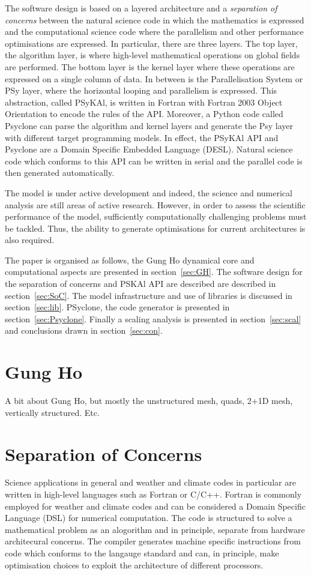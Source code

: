 \documentclass[times]{elsarticle}
\begin{document}
The software design is based on a layered architecture and a 
{\em separation of concerns} between the natural science code in which
the mathematics is expressed and the computational science code where the
parallelism and other performance optimisations are expressed. In particular,
there are three layers. The top layer, the algorithm layer, is where high-level mathematical 
operations on global fields are performed. The bottom layer is the kernel layer
where these operations are expressed on a single column of data. In between is the
Parallelisation System or PSy layer, where the horizontal looping and parallelism is
expressed. This abstraction, called PSyKAl, is written in Fortran with Fortran 2003
Object Orientation to encode the rules of the API.
Moreover, a Python code called Psyclone can parse the algorithm and kernel layers and
generate the Psy layer with different target programming models. In effect, the PSyKAl API
and Psyclone are a Domain Specific Embedded Language (DESL). Natural science code which
conforms to this API can be written in serial and the parallel code is then generated automatically.

The model is under active development and indeed, the science and
numerical analysis are still areas of active research. However, in
order to assess the scientific performance of the model, sufficiently
computationally challenging problems must be tackled. Thus, the
ability to generate optimisations for current architectures is also
required. 

The paper is organised as follows, the Gung Ho dynamical core and
computational aspects are presented in section~\ref{sec:GH}. The
software design for the separation of concerns and PSKAl API are described 
are described in section~\ref{sec:SoC}. The model infrastructure and
use of libraries is discussed in section~\ref{sec:lib}. PSyclone, the
code generator is presented in section~\ref{sec:Psyclone}. Finally a
scaling analysis is presented in section~\ref{sec:scal} and
conclusions drawn in section~\ref{sec:con}.

\section{\label{sec:GH}Gung Ho}
A bit about Gung Ho, but mostly the unstructured mesh, quads, 2+1D
mesh, vertically structured. Etc.

\section{\label{sec:SoC}Separation of Concerns}
Science applications in general and weather and climate codes in
particular are written in high-level languages such as Fortran or
C/C++. Fortran is commonly employed for weather and climate codes and
can be considered a Domain Specific Language (DSL) for numerical
computation.  The code is structured to solve a mathematical problem
as an alogorithm and in principle, separate from hardware architecural
concerns. The compiler generates machine specific instructions from
code which conforms to the langauge standard and can, in principle,
make optimisation choices to exploit the architecture of different
processors. 
\end{document}
